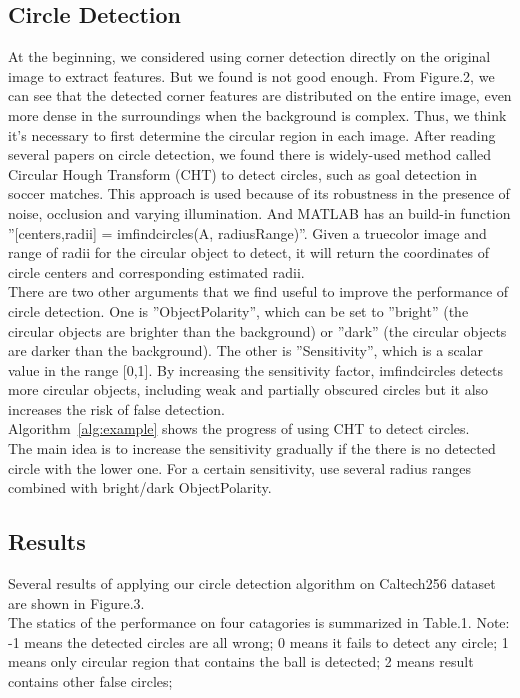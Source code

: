 \documentclass{article}
\begin{document}
\subsection{Circle Detection}
At the beginning, we considered using corner detection directly on the original image to extract features. But we found is not good enough. From Figure.2, we can see that the detected corner features are distributed on the entire image, even more dense in the surroundings when the background is complex. Thus, we think it's necessary to first determine the circular region in each image.
After reading several papers on circle detection, we found there is widely-used method called Circular Hough Transform (CHT) to detect circles, such as goal detection in soccer matches. This approach is used because of its robustness in the presence of noise, occlusion and varying illumination. And MATLAB has an build-in function ''[centers,radii] = imfindcircles(A, radiusRange)''. Given a truecolor image and range of radii for the circular object to detect, it will return the coordinates of circle centers and corresponding estimated radii.\\
There are two other arguments that we find useful to improve the performance of circle detection. One is ''ObjectPolarity'', which can be set to ''bright'' (the circular objects are brighter than the background) or ''dark'' (the circular objects are darker than the background). The other is ''Sensitivity'', which is a scalar value in the range [0,1]. By increasing the sensitivity factor, imfindcircles detects more circular objects, including weak and partially obscured circles but it also increases the risk of false detection.\\
Algorithm~\ref{alg:example} shows the progress of using CHT to detect circles.\\
The main idea is to increase the sensitivity gradually if the there is no detected circle with the lower one. For a certain sensitivity, use several radius ranges combined with bright/dark ObjectPolarity.

\subsection{Results}
 
Several results of applying our circle detection algorithm on Caltech256 dataset are shown in Figure.3.\\
The statics of the performance on four catagories is summarized in Table.1. Note: -1 means the detected circles are all wrong; 0 means it fails to detect any circle; 1 means only circular region that contains the ball is detected; 2 means result contains other false circles; 
\end{document}
